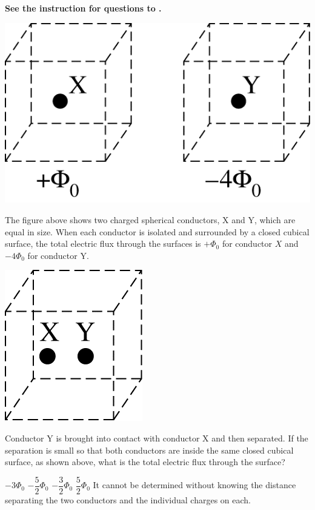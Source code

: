 
\textbf{See the instruction for questions  to .} 

\begin{center}
    \includegraphics[scale=0.3]{images/img-006-010.png}
\end{center}

The figure above shows two charged spherical conductors, X and Y, which are equal in size. When each conductor is isolated and surrounded by a closed cubical surface, the total electric flux through the surfaces is $+\Phi_{0}$ for conductor $X$ and $-4 \Phi_{0}$ for conductor Y.

\begin{center}
    \includegraphics[scale=0.3]{images/img-006-011.png}
\end{center}

\begin{questions}
\setcounter{question}{8}

\question
Conductor Y is brought into contact with conductor X and then separated. If the separation is small so that both conductors are inside the same closed cubical surface, as shown above, what is the total electric flux through the surface?

\begin{choices}
    \choice $-3 \Phi_{0}$
    \choice $-\dfrac{5}{2} \Phi_{0}$
    \choice $-\dfrac{3}{2} \Phi_{0}$
    \choice $\dfrac{5}{2} \Phi_{0}$
    \choice It cannot be determined without knowing the distance separating the two conductors and the individual charges on each.
\end{choices}
\end{questions}


